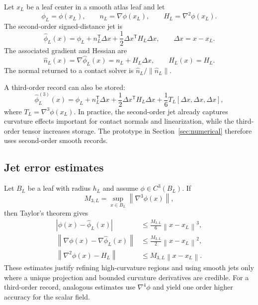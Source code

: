 \documentclass[preprint,12pt,sort&compress]{elsarticle}
\newcommand{\norm}[1]{\left\lVert #1 \right\rVert}
\newcommand{\abs}[1]{\left\lvert #1 \right\rvert}
\newcommand{\T}{\mathsf{T}}
\begin{document}
Let $x_L$ be a leaf center in a smooth atlas leaf and let
\begin{equation}
 \phi_L=\phi(x_L),\qquad n_L=\nabla\phi(x_L),\qquad H_L=\nabla^2\phi(x_L).
\end{equation}
The second-order signed-distance jet is
\begin{equation}
 \widehat{\phi}_L(x)=\phi_L+n_L^\T\Delta x+\frac{1}{2}\Delta x^\T H_L\Delta x,
 \qquad \Delta x=x-x_L.
\label{eq:second_order_jet}
\end{equation}
The associated gradient and Hessian are
\begin{equation}
 \widehat{n}_L(x)=\nabla\widehat\phi_L(x)=n_L+H_L\Delta x,
 \qquad \widehat H_L(x)=H_L.
\label{eq:jet_gradient}
\end{equation}
The normal returned to a contact solver is $\widehat n_L/\norm{\widehat n_L}$.

A third-order record can also be stored:
\begin{equation}
 \widehat{\phi}_L^{(3)}(x)=\phi_L+n_L^\T\Delta x+\frac{1}{2}\Delta x^\T H_L\Delta x
 +\frac{1}{6}T_L[\Delta x,\Delta x,\Delta x],
\label{eq:third_order_jet}
\end{equation}
where $T_L=\nabla^3\phi(x_L)$. In practice, the second-order jet already captures curvature effects important for contact normals and linearization, while the third-order tensor increases storage. The prototype in Section~\ref{sec:numerical} therefore uses second-order smooth records.

\subsection{Jet error estimates}

Let $B_L$ be a leaf with radius $h_L$ and assume $\phi\in C^3(B_L)$. If
\begin{equation}
 M_{3,L}=\sup_{x\in B_L}\norm{\nabla^3\phi(x)},
\end{equation}
then Taylor's theorem gives
\begin{align}
 \abs{\phi(x)-\widehat\phi_L(x)} &\leq \frac{M_{3,L}}{6}\norm{x-x_L}^3,\label{eq:error_phi}\\
 \norm{\nabla\phi(x)-\nabla\widehat\phi_L(x)} &\leq \frac{M_{3,L}}{2}\norm{x-x_L}^2,\label{eq:error_grad}\\
 \norm{\nabla^2\phi(x)-H_L} &\leq M_{3,L}\norm{x-x_L}.\label{eq:error_hessian}
\end{align}
These estimates justify refining high-curvature regions and using smooth jets only where a unique projection and bounded curvature derivatives are credible. For a third-order record, analogous estimates use $\nabla^4\phi$ and yield one order higher accuracy for the scalar field.
\end{document}
